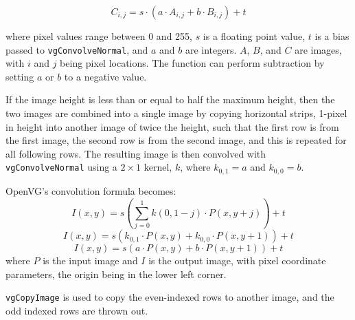 \documentclass[12pt]{report}
\def\byX {\!\!\times\!\!}
\begin{document}
\[C_{i,j} = s\cdot(a\cdot A_{i,j} + b\cdot B_{i,j})+t\]

where pixel values range between 0 and 255, $s$ is a floating point
value, $t$ is a bias passed to {\tt vgConvolveNormal}, and $a$ and $b$
are integers. $A$, $B$, and $C$ are images, with $i$ and $j$ being
pixel locations. The function can perform subtraction by setting $a$
or $b$ to a negative value.

If the image height is less than or equal to half the maximum height,
then the two images are combined into a single image by copying
horizontal strips, 1-pixel in height into another image of twice the
height, such that the first row is from the first image, the second
row is from the second image, and this is repeated for all following
rows. The resulting image is then convolved with {\tt
  vgConvolveNormal} using a $2\byX 1$ kernel, $k$, where
$k_{0,1} = a$ and $k_{0,0} = b$.

OpenVG's convolution formula becomes:
\[I(x,y) = s\left(\sum_{j=0}^1 k(0,1-j)\cdot P(x,y+j)\right)+t\]
\[I(x,y) = s(k_{0,1}\cdot P(x,y) + k_{0,0}\cdot P(x,y+1))+t\]
\[I(x,y) = s(a\cdot P(x,y) + b\cdot P(x,y+1))+t\]
where $P$ is the input image and $I$ is the output image, with
pixel coordinate parameters, the origin being in the lower left
corner.

{\tt vgCopyImage} is used to copy the even-indexed rows to another
image, and the odd indexed rows are thrown out.
\end{document}
